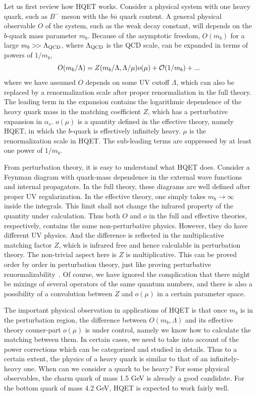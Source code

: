 \documentclass[aps,prd,preprint,tightenlines,superscriptaddress]{revtex4}
\begin{document}
Let us first review how HQET works. Consider a physical system with one heavy quark, such as
$B^-$ meson with the $b\bar u$ quark content. A general physical observable $O$ of the system,
such as the weak decay constant, will depends on the $b$-quark mass parameter $m_b$.
Because of the asymptotic freedom, $O(m_b)$ for a large $m_b>\!>\Lambda_{\rm QCD}$, where $\Lambda_{\rm QCD}$
is the QCD scale, can be expanded in terms of powers of $1/m_b$,
\begin{equation}
             O(m_b/\Lambda) = Z(m_b/\Lambda, \Lambda/\mu)o(\mu) + {\cal O}(1/m_b)+ ...
\end{equation}
where we have assumed $O$ depends on some UV cutoff $\Lambda$, which can also be replaced
by a renormalization scale after proper renormaliation in the full theory.
The leading term in the expansion contains the logarithmic dependence of the heavy
quark mass in the matching coefficient $Z$, which has a perturbative
expansion in $\alpha_s$. $o(\mu)$ is a quantity defined in the effective theory,
namely HQET, in which the $b$-quark is effectively infinitely heavy. 
$\mu$ is the renormalization scale in HQET. The sub-leading terms are suppressed
by at least one power of $1/m_b$.

From perturbation theory, it is easy to understand what HQET does. Consider a Feynman diagram
with quark-mass dependence in the external wave functions and internal propagators. In the full theory,
these diagrams are well defined after proper UV regularization. In the effective theory, one simply
takes $m_b\rightarrow \infty$ inside the integrals. This limit shall not change the infrared
property of the quantity under calculation. Thus both $O$ and $o$ in the full and effective theories, respectively,
contains the same non-perturbative physics. However, they do have different UV physics.
And the difference is reflected in the multiplicative matching factor $Z$, which is infrared free
and hence calculable in perturbation theory. The non-trivial aspect here is $Z$
is multiplicative. This can be proved order by order in perturbation theory, just like
proving perturbative renormalizability~\cite{Collins:1984xc}. Of course, we have ignored the complication
that there might be mixings of several operators of the same quantum numbers, and 
there is also a possibility of a convolution between $Z$ and $o(\mu)$ in a certain parameter space.

The important physical observation in applications of HQET is that once $m_b$ is in the perturbation region,
the difference between $O(m_b, \Lambda)$ and its effective theory couner-part $o(\mu)$ is under control, namely we know
how to calculate the matching between them. In certain cases, we need to take into account
of the power corrections which can be categorized and studied in details. Thus to a certain extent,
the physics of a heavy quark is similar to that of an infinitely-heavy one. When can we consider a quark
to be heavy? For some physical observables, the charm quark of mass 1.5 GeV is already a good candidate.
For the bottom quark of mass 4.2 GeV, HQET is expected to work fairly well.
\end{document}
